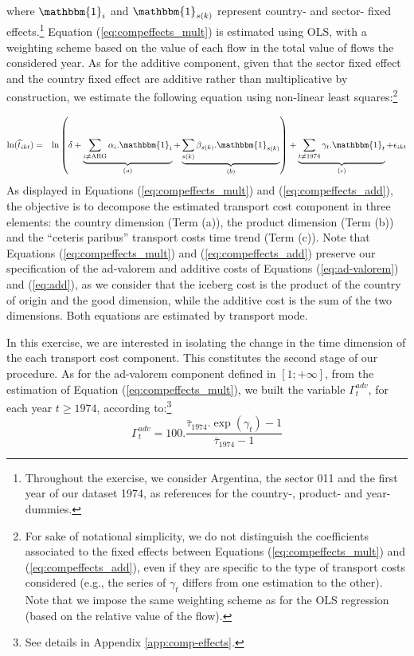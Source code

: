 \documentclass[a4paper,11pt]{article}
\begin{document}
\noindent where $\mathbbm{1}_i$ and $\mathbbm{1}_{s(k)}$ represent country- and sector- fixed effects.\footnote{Throughout the exercise, we consider Argentina, the sector 011 and the first year of our dataset 1974, as references for the country-, product- and year- dummies.}  Equation (\ref{eq:compeffects_mult}) is estimated using OLS, with a weighting scheme based on the value of each flow in the total value of flows the considered year. As for the additive component, given that the sector fixed effect and the country fixed effect are additive rather than multiplicative by construction, we estimate the following equation using non-linear least squares:\footnote{For sake of notational simplicity, we do not distinguish the coefficients associated to the fixed effects between Equations (\ref{eq:compeffects_mult}) and (\ref{eq:compeffects_add}), even if they are specific to the type of transport costs considered (e.g., the series of $\gamma_t$ differs from one estimation to the other). Note that we impose the same weighting scheme as for the OLS regression (based on the relative value of the flow).}

\begin{eqnarray}
\ln(\widehat{t}_{ikt})&=&\ln\left( \delta + \underbrace{\sum_{i \neq \text{ARG}}  \alpha_i.\mathbbm{1}_i}_{(a)}+\underbrace{\sum_{s(k)}\beta_{s(k)}.\mathbbm{1}_{s(k)}}_{(b)}\right) + \underbrace{\sum_{t \neq 1974}\gamma_t.\mathbbm{1}_t}_{(c)}+\epsilon_{ikt} \label{eq:compeffects_add}
\end{eqnarray}
As displayed in Equations (\ref{eq:compeffects_mult}) and (\ref{eq:compeffects_add}), the objective is to decompose the estimated transport cost component in three elements: the country dimension (Term (a)), the product dimension (Term (b)) and the ``ceteris paribus'' transport costs time trend (Term (c)). Note that Equations (\ref{eq:compeffects_mult}) and (\ref{eq:compeffects_add}) preserve our specification of the ad-valorem and additive costs of Equations (\ref{eq:ad-valorem}) and (\ref{eq:add}), as we consider that the iceberg cost is the product of the country of origin and the good dimension, while the additive cost is the sum of the two dimensions. Both equations are estimated by transport mode.\smallskip

In this exercise, we are interested in isolating the change in the time dimension of the each transport cost component. This constitutes the second stage of our procedure. As for the ad-valorem component defined in $[1;+\infty]$, from the estimation of Equation (\ref{eq:compeffects_mult}), we built the variable $\Gamma^{adv}_t$, for each year $t\geq 1974$, according to:\footnote{See details in Appendix \ref{app:comp-effects}.}
\begin{equation}
\Gamma^{adv}_t = 100.\frac {\bar{\tau}_{1974}.\exp(\gamma_t)-1} {\bar{\tau}_{1974}-1} \label{eq:comp_effects_adv}
\end{equation}
\end{document}
